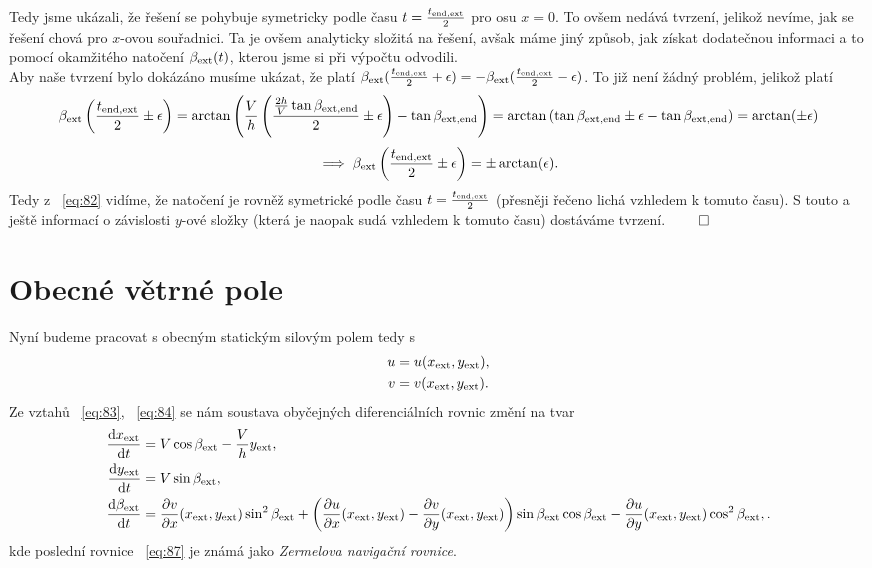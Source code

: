 \documentclass[reqno, a4paper]{amsart}
\begin{document}
Tedy jsme ukázali, že řešení se pohybuje symetricky podle času $t=\frac{ t_{\mathrm{end}, \mathrm{ext}}}{2}$ pro osu $x=0$. To ovšem nedává tvrzení, jelikož nevíme, jak se řešení chová pro $x$-ovou souřadnici. Ta je ovšem analyticky složitá na řešení, avšak máme jiný způsob, jak získat dodatečnou informaci a to pomocí okamžitého natočení $\beta_{\mathrm{ext}}(t)$, kterou jsme si při výpočtu odvodili.\\
Aby naše tvrzení bylo dokázáno musíme ukázat, že platí $\beta_{\mathrm{ext}}(\frac{ t_{\mathrm{end}, \mathrm{ext}}}{2}+\epsilon)=-\beta_{\mathrm{ext}}(\frac{ t_{\mathrm{end}, \mathrm{ext}}}{2}-\epsilon)$. To již není žádný problém, jelikož platí
\begin{equation*}
	\beta_{\mathrm{ext}}\left( \frac{ t_{\mathrm{end}, \mathrm{ext}}}{2}\pm\epsilon\right) =\arctan\left( \frac{V}{h}\left( \frac{ \frac{2h}{V}\tan\beta_{\mathrm{ext}, \mathrm{end}}}{2}\pm\epsilon\right) - \tan \beta_{\mathrm{ext}, \mathrm{end}}\right) 
	= \arctan\left( \tan \beta_{\mathrm{ext}, \mathrm{end}}\pm\epsilon - \tan \beta_{\mathrm{ext}, \mathrm{end}}\right)
	=\arctan(\pm\epsilon)
\end{equation*}
\begin{equation}
	\label{eq:82}
	\implies \beta_{\mathrm{ext}}\left( \frac{ t_{\mathrm{end}, \mathrm{ext}}}{2}\pm\epsilon\right) =\pm\arctan(\epsilon).
\end{equation}
Tedy z ~\eqref{eq:82} vidíme, že natočení je rovněž symetrické podle času $t=\frac{ t_{\mathrm{end}, \mathrm{ext}}}{2}$ (přesněji řečeno lichá vzhledem k tomuto času). S touto a ještě informací o závislosti $y$-ové složky (která je naopak sudá vzhledem k tomuto času) dostáváme tvrzení. $\qed$\\
\section{Obecné větrné pole}
Nyní budeme pracovat s obecným statickým silovým polem tedy s
\label{eq:56}
\begin{subequations}
\begin{align}
	\label{eq:83}
	u &= u(x_{\mathrm{ext}},y_{\mathrm{ext}}), \\
	\label{eq:84}
	v &= v(x_{\mathrm{ext}},y_{\mathrm{ext}}).
\end{align}
\end{subequations}
Ze vztahů ~\eqref{eq:83}, ~\eqref{eq:84} se nám soustava obyčejných diferenciálních rovnic změní na tvar
\begin{subequations}
	\label{eq:59}
	\begin{align}
		\label{eq:85}
		\frac{\mathrm{d} {x_{\mathrm{ext}}}}{\mathrm{d} {t}}
		&=
		V \cos \beta_{\mathrm{ext}} - \frac{V}{h}y_{\mathrm{ext}},  \\
		\label{eq:86}
		\frac{\mathrm{d} {y_{\mathrm{ext}}}}{\mathrm{d} {t}}
		&=
		V \sin \beta_{\mathrm{ext}},  \\
		\label{eq:87}
		\frac{\mathrm{d} {\beta_{\mathrm{ext}}}}{\mathrm{d} {t}}
		&=
		\frac{\partial v}{\partial x}(x_{\mathrm{ext}},y_{\mathrm{ext}})\sin^2 \beta_{\mathrm{ext}}+\left(\frac{\partial u}{\partial x}(x_{\mathrm{ext}},y_{\mathrm{ext}})-\frac{\partial v}{\partial y}(x_{\mathrm{ext}},y_{\mathrm{ext}})\right)\sin \beta_{\mathrm{ext}}\cos \beta_{\mathrm{ext}}-\frac{\partial u}{\partial y}(x_{\mathrm{ext}},y_{\mathrm{ext}})\cos^2 \beta_{\mathrm{ext}},
		.
	\end{align}
\end{subequations}
kde poslední rovnice ~\eqref{eq:87} je známá jako \textit{Zermelova navigační rovnice}.
\end{document}
